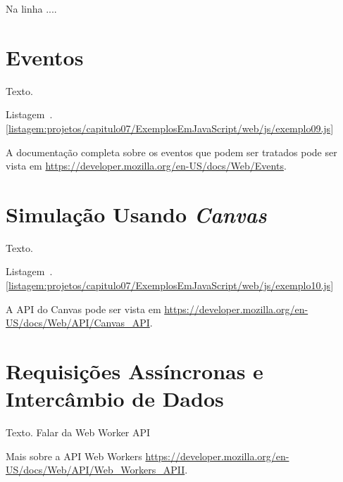 
Na linha ....


\section{Eventos}

Texto.

Listagem~\thechapter.\ref{listagem:projetos/capitulo07/ExemplosEmJavaScript/web/js/exemplo09.js}


\begin{saibaMais}
    A documentação completa sobre os eventos que podem ser tratados pode ser vista em  \url{https://developer.mozilla.org/en-US/docs/Web/Events}.
\end{saibaMais}



\section{Simulação Usando \textit{Canvas}}

Texto.

Listagem~\thechapter.\ref{listagem:projetos/capitulo07/ExemplosEmJavaScript/web/js/exemplo10.js}


\begin{saibaMais}
    A API do Canvas pode ser vista em \url{https://developer.mozilla.org/en-US/docs/Web/API/Canvas_API}.
\end{saibaMais}



\section{Requisições Assíncronas e Intercâmbio de Dados}

Texto. Falar da Web Worker API

\begin{saibaMais}
    Mais sobre a API Web Workers \url{https://developer.mozilla.org/en-US/docs/Web/API/Web_Workers_APII}.
\end{saibaMais}


